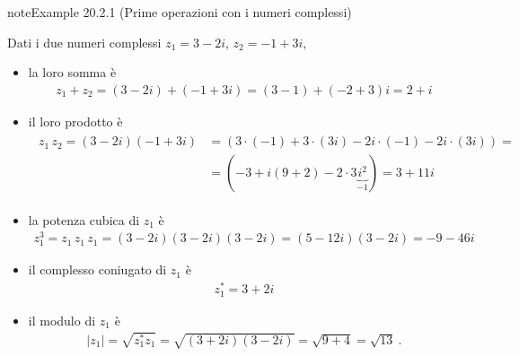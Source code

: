 \documentclass[letterpaper,10pt,italian]{jupyterBook}
\begin{document}
\begin{sphinxadmonition}{note}{Example 20.2.1 (Prime operazioni con i numeri complessi)}



\sphinxAtStartPar
Dati i due numeri complessi \(z_1 = 3 - 2 i\), \(z_2 = -1 + 3 i\),
\begin{itemize}
\item {} 
\sphinxAtStartPar
la loro somma è
\begin{equation*}
\begin{split}z_1 + z_2 = (3 - 2i) + (-1 + 3 i) = (3-1) +(-2+3)i = 2 + i\end{split}
\end{equation*}
\item {} 
\sphinxAtStartPar
il loro prodotto è
\begin{equation*}
\begin{split}\begin{aligned}
    z_1 \, z_2 = (3-2i)(-1+3i) & = ( 3 \cdot (-1) + 3 \cdot (3i) - 2i \cdot (-1) - 2i \cdot (3i) ) = \\
    & = (-3 + i ( 9 + 2 ) - 2 \cdot 3 \underbrace{i^2}_{-1} ) = 3 + 11 i
   \end{aligned}\end{split}
\end{equation*}
\item {} 
\sphinxAtStartPar
la potenza cubica di \(z_1\) è
\begin{equation*}
\begin{split}z_1^3 = z_1 \, z_1 \, z_1 = (3-2i)(3-2i)(3-2i) = (5-12 i)(3-2i) = -9 - 46 i\end{split}
\end{equation*}
\item {} 
\sphinxAtStartPar
il complesso coniugato di \(z_1\) è
\begin{equation*}
\begin{split}z_1^* = 3 + 2 i\end{split}
\end{equation*}
\item {} 
\sphinxAtStartPar
il modulo di \(z_1\) è
\begin{equation*}
\begin{split}|z_1| = \sqrt{z_1^* z_1} = \sqrt{(3+2 i)(3-2i)} = \sqrt{9+4} = \sqrt{13} \ .\end{split}
\end{equation*}
\end{itemize}
\end{sphinxadmonition}
\end{document}
